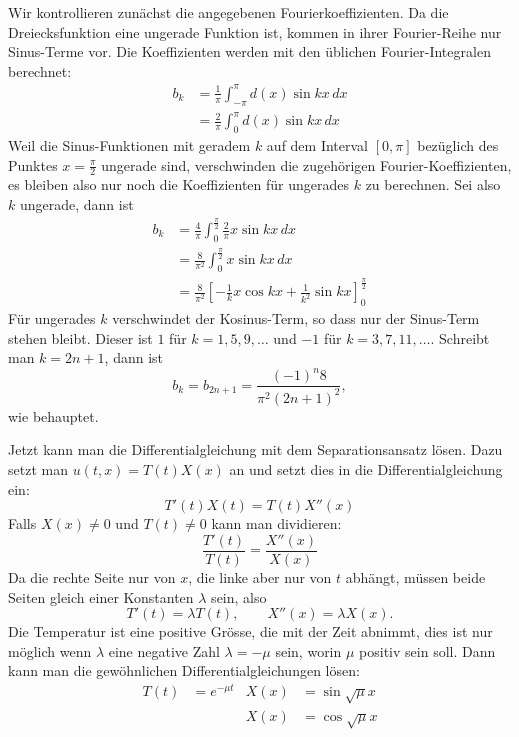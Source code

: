 \begin{loesung}
Wir kontrollieren zunächst die angegebenen Fourierkoeffizienten.
Da die Dreiecksfunktion eine ungerade Funktion ist, kommen in ihrer
Fourier-Reihe nur Sinus-Terme vor. Die Koeffizienten werden mit
den üblichen Fourier-Integralen berechnet:
\begin{align*}
b_k&=\frac{1}{\pi}\int_{-\pi}^{\pi} d(x)\sin kx\,dx\\
&=\frac{2}{\pi}\int_{0}^{\pi} d(x)\sin kx\,dx
\end{align*}
Weil die Sinus-Funktionen mit geradem $k$ auf dem Interval $[0,\pi]$
bezüglich des Punktes $x=\frac{\pi}2$ ungerade sind, verschwinden die
zugehörigen Fourier-Koeffizienten, es bleiben also nur noch die
Koeffizienten für ungerades $k$ zu berechnen. Sei also $k$ ungerade, dann
ist
\begin{align*}
b_k
&=
\frac{4}{\pi}\int_0^{\frac{\pi}2} \frac{2}{\pi}x\sin kx\,dx
\\
&=
\frac{8}{\pi^2}\int_0^{\frac{\pi}2} x\sin kx\,dx
\\
&=
\frac{8}{\pi^2}\left[ -\frac{1}kx\cos kx+\frac1{k^2}\sin kx\right]_0^{\frac{\pi}2}
\end{align*}
Für ungerades $k$ verschwindet der Kosinus-Term, so dass nur der Sinus-Term
stehen bleibt. Dieser ist $1$ für $k=1,5,9,\dots$ und $-1$ für $k=3,7,11,\dots$.
Schreibt man $k=2n+1$, dann ist
\[
b_k=b_{2n+1}=\frac{(-1)^n8}{\pi^2(2n+1)^2},
\]
wie behauptet.

Jetzt kann man die Differentialgleichung mit dem Separationsansatz
lösen. Dazu setzt man $u(t,x)=T(t)X(x)$ an und setzt dies in die
Differentialgleichung ein:
\[
T'(t)X(t)=T(t)X''(x)
\]
Falls $X(x)\ne 0$ und $T(t)\ne 0$ kann man dividieren:
\[
\frac{T'(t)}{T(t)}=\frac{X''(x)}{X(x)}
\]
Da die rechte Seite nur von $x$, die linke aber nur von $t$ abhängt,
müssen beide Seiten gleich einer Konstanten $\lambda$ sein, also
\[
T'(t)=\lambda T(t),\qquad X''(x)=\lambda X(x).
\]
Die Temperatur ist eine positive Grösse, die mit der Zeit abnimmt,
dies ist nur möglich wenn $\lambda$ eine negative Zahl $\lambda=-\mu$
sein, worin $\mu$ positiv sein soll. Dann kann man die gewöhnlichen
Differentialgleichungen lösen:
\begin{align*}
T(t)&=e^{-\mu t}&X(x)&=\sin\sqrt{\mu}x\\
    &            &X(x)&=\cos\sqrt{\mu}x
\end{align*}


\end{loesung}
